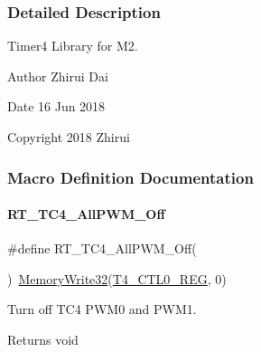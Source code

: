 \subsubsection{Detailed Description}
Timer4 Library for M2. 

\begin{DoxyAuthor}{Author}
Zhirui Dai 
\end{DoxyAuthor}
\begin{DoxyDate}{Date}
16 Jun 2018 
\end{DoxyDate}
\begin{DoxyCopyright}{Copyright}
2018 Zhirui 
\end{DoxyCopyright}


\subsubsection{Macro Definition Documentation}
\mbox{\label{a00050_a810820140a90f26db974ea72d81fac27}} 
\paragraph{\texorpdfstring{R\+T\+\_\+\+T\+C4\+\_\+\+All\+P\+W\+M\+\_\+\+Off}{RT\_TC4\_AllPWM\_Off}}
{\footnotesize\ttfamily \#define R\+T\+\_\+\+T\+C4\+\_\+\+All\+P\+W\+M\+\_\+\+Off(\begin{DoxyParamCaption}{ }\end{DoxyParamCaption})~\mbox{\hyperlink{a00020_a6b9732365b12e48ddb89fe1028b975b0}{Memory\+Write32}}(\mbox{\hyperlink{a00020_a83136367fd85cd43cec90995ad0f51ef}{T4\+\_\+\+C\+T\+L0\+\_\+\+R\+EG}}, 0)}



Turn off T\+C4 P\+W\+M0 and P\+W\+M1. 

\begin{DoxyReturn}{Returns}
void 
\end{DoxyReturn}
\mbox{\label{a00050_af7e9317dddf60349a86619afdef1fba8}} 

